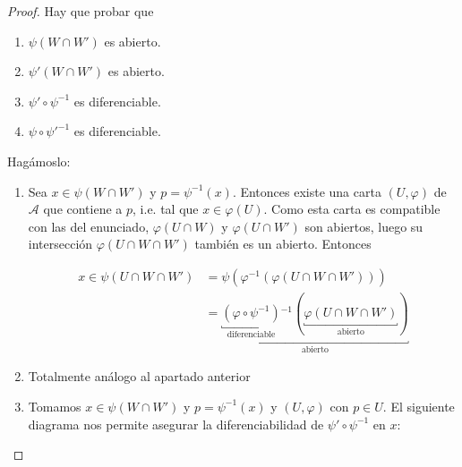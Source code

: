 \documentclass[\main/VD_completo.tex]{subfiles}
\begin{document}
\begin{proof}
  Hay que probar que
  \begin{enumerate}
  \item \label{proof:cta-psi-abierto} \(\psi(W \cap W')\) es abierto.
  \item \label{proof:cta-psi'-abierto} \(\psi'(W \cap W')\) es abierto.
  \item \label{proof:cta-cambio'-dif}\(\psi' \circ \psi^{-1}\) es diferenciable.
  \item \label{proof:cta-cambio-dif} \(\psi \circ \psi'^{-1}\) es diferenciable.
  \end{enumerate}

  Hagámoslo:

  \begin{enumerate}
  \item[\ref{proof:cta-psi-abierto}.]
    \begin{subproof}
      Sea \(x \in \psi(W \cap W')\) y \(p = \psi^{-1}(x)\). Entonces existe una
      carta \((U,\varphi)\) de \(\mathcal{A}\) que contiene a \(p\), i.e. tal que
      \(x \in \varphi(U)\). Como esta carta es compatible con las del enunciado,
      \(\varphi(U \cap W)\) y \(\varphi(U \cap W')\) son abiertos, luego su
      intersección \(\varphi(U \cap W \cap W')\) también es un abierto. Entonces

    \begin{align*}
      x \in \psi(U \cap W \cap W')
      &= \psi(\varphi^{-1}(\varphi(U \cap W \cap W')))\\
      &= \underbracket{\underbracket{(\varphi \circ \psi^{-1})}_{\text{diferenciable}}{}^{-1} (
        \underbracket{\varphi(U \cap W \cap W')}_{\text{abierto}}
        )}_{\text{abierto}}
    \end{align*}
  \end{subproof}

  \item[\ref{proof:cta-psi'-abierto}.]
  \begin{subproof}
    Totalmente análogo al apartado anterior
  \end{subproof}

  \item[\ref{proof:cta-cambio'-dif}.]
  \begin{subproof}
    Tomamos \(x \in \psi(W \cap W')\) y \(p = \psi^{-1}(x)\) y \((U,\varphi)\)
    con \(p \in U\). El siguiente diagrama nos permite asegurar la
    diferenciabilidad de \(\psi' \circ \psi^{-1}\) en \(x\):


\end{subproof}
\end{enumerate}
\end{proof}
\end{document}
